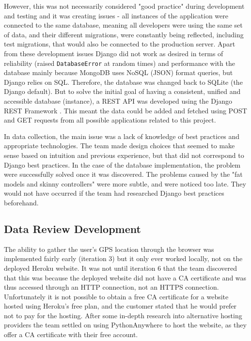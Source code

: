\documentclass{l3proj}
\begin{document}
However, this was not necessarily considered "good practice" during development and testing and it was creating issues - all instances of the application were connected to the same database, meaning all developers were using the same set of data, and their different migrations, were constantly being reflected, including test migrations, that would also be connected to the production server. Apart from these development issues Django did not work as desired in terms of reliability (raised \texttt{DatabaseError} at random times) and performance with the database mainly because MongoDB uses NoSQL (JSON) format queries, but Django relies on SQL. Therefore, the database was changed back to SQLite (the Django default). But to solve the initial goal of having a consistent, unified and accessible database (instance), a REST API was developed using the Django REST Framework \cite{DRF}. This meant the data could be added and fetched using POST and GET requests from all possible applications related to this project.

In data collection, the main issue was a lack of knowledge of best practices and appropriate technologies. The team made design choices that seemed to make sense based on intuition and previous experience, but that did not correspond to Django best practices. In the case of the database implementation, the problem were successfully solved once it was discovered. The problems caused by the "fat models and skinny controllers" were more subtle, and were noticed too late. They would not have occurred if the team had researched Django best practices beforehand.


\subsection{Data Review Development}
The ability to gather the user's GPS location through the browser was implemented fairly early (iteration 3) but it only ever worked locally, not on the deployed Heroku website. It was not until iteration 6 that the team discovered that this was because the deployed website did not have a CA certificate and was thus accessed through an HTTP connection, not an HTTPS connection. Unfortunately it is not possible to obtain a free CA certificate for a website hosted using Heroku's free plan, and the customer stated that he would prefer not to pay for the hosting. After some in-depth research into alternative hosting providers the team settled on using PythonAnywhere to host the website, as they offer a CA certificate with their free account. 
\end{document}
